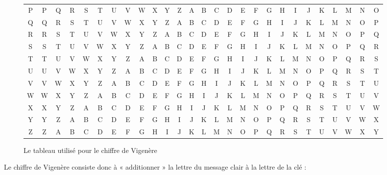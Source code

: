 \begin{figure}[h]
\begin{center}
\begin{tabular}{c|c@{}c@{}c@{}c@{}c@{}c@{}c@{}c@{}c@{}c@{}c@{}c@{}c@{}c@{}c@{}c@{}c@{}c@{}c@{}c@{}c@{}c@{}c@{}c@{}c@{}c}
      P & P & Q & R & S & T & U & V & W & X & Y & Z & A & B & C & D & E & F & G & H & I & J & K & L & M & N & O \\
      Q & Q & R & S & T & U & V & W & X & Y & Z & A & B & C & D & E & F & G & H & I & J & K & L & M & N & O & P \\
      R & R & S & T & U & V & W & X & Y & Z & A & B & C & D & E & F & G & H & I & J & K & L & M & N & O & P & Q \\
      S & S & T & U & V & W & X & Y & Z & A & B & C & D & E & F & G & H & I & J & K & L & M & N & O & P & Q & R \\
      T & T & U & V & W & X & Y & Z & A & B & C & D & E & F & G & H & I & J & K & L & M & N & O & P & Q & R & S \\
      U & U & V & W & X & Y & Z & A & B & C & D & E & F & G & H & I & J & K & L & M & N & O & P & Q & R & S & T \\
      V & V & W & X & Y & Z & A & B & C & D & E & F & G & H & I & J & K & L & M & N & O & P & Q & R & S & T & U \\
      W & W & X & Y & Z & A & B & C & D & E & F & G & H & I & J & K & L & M & N & O & P & Q & R & S & T & U & V \\
      X & X & Y & Z & A & B & C & D & E & F & G & H & I & J & K & L & M & N & O & P & Q & R & S & T & U & V & W \\
      Y & Y & Z & A & B & C & D & E & F & G & H & I & J & K & L & M & N & O & P & Q & R & S & T & U & V & W & X \\
      Z & Z & A & B & C & D & E & F & G & H & I & J & K & L & M & N & O & P & Q & R & S & T & U & V & W & X & Y \\
    \end{tabular}
  \end{center}
  \caption{Le tableau utilisé pour le chiffre de Vigenère}
  \label{fig:vigeneretableau}
\end{figure}

Le chiffre de Vigenère consiste donc à « additionner » la lettre du
message clair à la lettre de la clé : 

